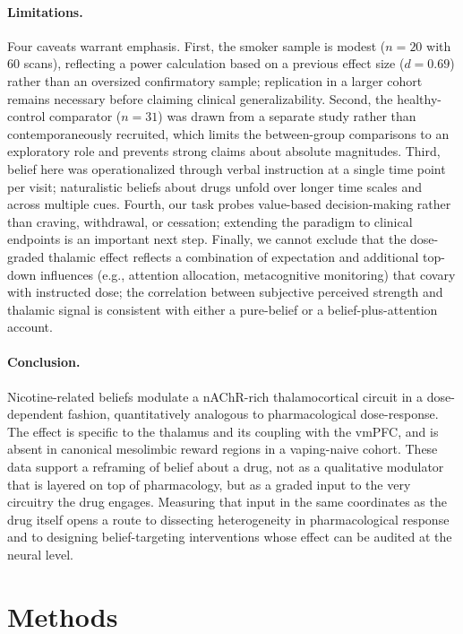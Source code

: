\documentclass[11pt]{article}
\begin{document}
\paragraph{Limitations.} Four caveats warrant emphasis. First, the smoker sample is modest ($n=20$ with 60 scans), reflecting a power calculation based on a previous effect size ($d=0.69$) rather than an oversized confirmatory sample; replication in a larger cohort remains necessary before claiming clinical generalizability. Second, the healthy-control comparator ($n=31$) was drawn from a separate study rather than contemporaneously recruited, which limits the between-group comparisons to an exploratory role and prevents strong claims about absolute magnitudes. Third, belief here was operationalized through verbal instruction at a single time point per visit; naturalistic beliefs about drugs unfold over longer time scales and across multiple cues. Fourth, our task probes value-based decision-making rather than craving, withdrawal, or cessation; extending the paradigm to clinical endpoints is an important next step. Finally, we cannot exclude that the dose-graded thalamic effect reflects a combination of expectation and additional top-down influences (e.g., attention allocation, metacognitive monitoring) that covary with instructed dose; the correlation between subjective perceived strength and thalamic signal is consistent with either a pure-belief or a belief-plus-attention account.

\paragraph{Conclusion.} Nicotine-related beliefs modulate a nAChR-rich thalamocortical circuit in a dose-dependent fashion, quantitatively analogous to pharmacological dose-response. The effect is specific to the thalamus and its coupling with the vmPFC, and is absent in canonical mesolimbic reward regions in a vaping-naive cohort. These data support a reframing of belief about a drug, not as a qualitative modulator that is layered on top of pharmacology, but as a graded input to the very circuitry the drug engages. Measuring that input in the same coordinates as the drug itself opens a route to dissecting heterogeneity in pharmacological response and to designing belief-targeting interventions whose effect can be audited at the neural level.

\section{Methods}
\end{document}
